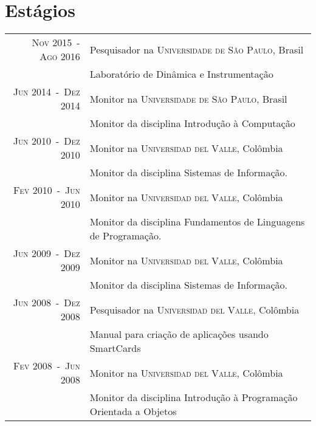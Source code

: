 \documentclass[a4paper,10pt]{article}
\begin{document}
\section{Estágios}
\begin{tabular}{rl}

    \textsc{Nov 2015~-~Ago 2016}  & Pesquisador na \textsc{Universidade de São Paulo}, Brasil \\
                                  &\footnotesize{Laboratório de Dinâmica e Instrumentação} \\

    \textsc{Jun 2014~-~Dez 2014}  & Monitor na \textsc{Universidade de São Paulo}, Brasil \\
                                  &\footnotesize{Monitor da disciplina Introdução à Computação} \\

    \textsc{Jun 2010~-~Dez 2010}  & Monitor na \textsc{Universidad del Valle}, Colômbia \\
                                  &\footnotesize{Monitor da disciplina Sistemas de Informação.} \\

    \textsc{Fev 2010~-~Jun 2010}  & Monitor na \textsc{Universidad del Valle}, Colômbia \\
                                  &\footnotesize{Monitor da disciplina Fundamentos de Linguagens de Programação.} \\

    \textsc{Jun 2009~-~Dez 2009}  & Monitor na \textsc{Universidad del Valle}, Colômbia \\
                                  &\footnotesize{Monitor da disciplina Sistemas de Informação.} \\

    \textsc{Jun 2008~-~Dez 2008}  & Pesquisador na \textsc{Universidad del Valle}, Colômbia \\
                                  &\footnotesize{Manual para criação de aplicações usando SmartCards} \\

    \textsc{Fev 2008~-~Jun 2008}  & Monitor na \textsc{Universidad del Valle}, Colômbia \\
                                  &\footnotesize{Monitor da disciplina Introdução à Programação Orientada a Objetos} \\

\end{tabular}
\end{document}
